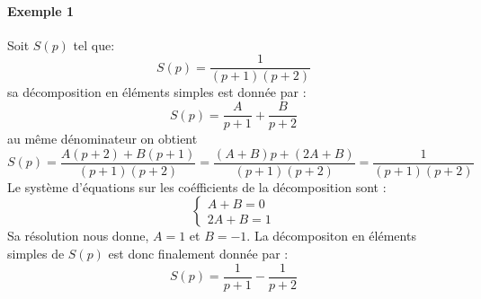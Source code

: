 \paragraph{Exemple 1}
Soit $S(p)$ tel que:
\[
S(p)=\dfrac{1}{(p+1)(p+2)}
\]
sa décomposition en éléments simples est donnée par :
\[
S(p)=\dfrac{A}{p+1}+\dfrac{B}{p+2}
\]
au même dénominateur on obtient
\[
S(p)=\dfrac{A(p+2)+B(p+1)}{(p+1)(p+2)}
    =\dfrac{(A+B)p+(2A+B)}{(p+1)(p+2)}
    =\dfrac{1}{(p+1)(p+2)}
\]
Le système d'équations sur les coéfficients de la décomposition sont :
\[
\begin{cases}
    A+B=0\\
    2A+B=1
\end{cases}
\]
Sa résolution nous donne, $A=1$ et $B=-1$.
La décompositon en éléments simples de $S(p)$ est donc finalement donnée 
par :
\[
S(p)=\dfrac{1}{p+1}-\dfrac{1}{p+2}
\]


